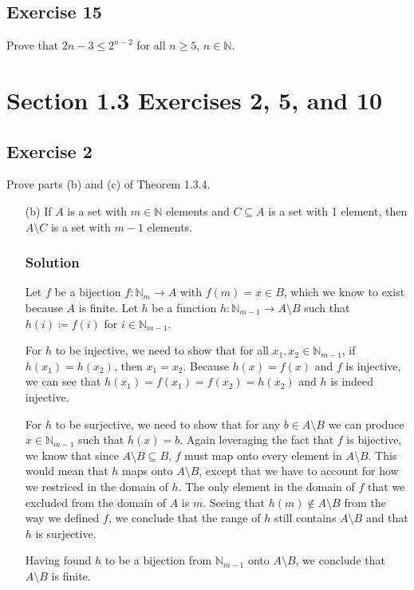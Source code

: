 \documentclass[12pt]{article}
\begin{document}
\subsection*{Exercise 15}
Prove that $2n - 3 \leq 2^{n-2}$ for all $n \geq 5$, $n \in \mathbb{N}$.

\section*{Section 1.3 Exercises 2, 5, and 10}

\subsection*{Exercise 2}
Prove parts (b) and (c) of Theorem 1.3.4.
\begin{itemize}
\item[(b)] If $A$ is a set with $m \in \mathbb{N}$ elements and $C \subseteq A$ is a set with 1 element, then $A \setminus C$ is a set with $m - 1$ elements.
\subsubsection*{Solution}
Let $f$ be a bijection $f : \mathbb{N}_m \to A$ with $f(m) = x \in B$, which we know to exist because $A$ is finite.
Let $h$ be a function $h : \mathbb{N}_{m-1} \to A \setminus B$ such that $h(i) \coloneqq f(i)$ for $i \in \mathbb{N}_{m - 1}$.

For $h$ to be injective, we need to show that for all $x_1, x_2 \in \mathbb{N}_{m-1}$, if $h\left(x_1\right) = h\left(x_2\right)$, then $x_1 = x_2$. Because $h(x) = f(x)$ and $f$ is injective, we can see that $h\left(x_1\right) = f\left(x_1\right) = f\left(x_2\right) = h\left(x_2\right)$ and $h$ is indeed injective.

For $h$ to be surjective, we need to show that for any $b \in A \setminus B$ we can produce $x \in \mathbb{N}_{m-1}$ such that $h\left(x\right) = b$. Again leveraging the fact that $f$ is bijective, we know that since $A \setminus B \subseteq B$, $f$ must map onto every element in $A \setminus B$. This would mean that $h$ maps onto $A \setminus B$, except that we have to account for how we restriced in the domain of $h$. The only element in the domain of $f$ that we excluded from the domain of $A$ is $m$. Seeing that $h\left(m\right) \notin A \setminus B$ from the way we defined $f$, we conclude that the range of $h$ still contains $A \setminus B$ and that $h$ is surjective.

Having found $h$ to be a bijection from $\mathbb{N}_{m-1}$ onto $A \setminus B$, we conclude that $A \setminus B$ is finite.


\end{itemize}
\end{document}
